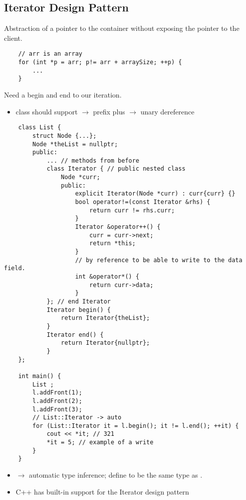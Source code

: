 \subsection{Iterator Design Pattern}
Abstraction of a pointer to the container without exposing the pointer to the client.
\begin{lstlisting}
    // arr is an array
    for (int *p = arr; p!= arr + arraySize; ++p) {
        ...
    }
\end{lstlisting}
Need a begin and end to our iteration.
\begin{itemize}
    \item class should support
    \subitem \code{!=}
    \subitem \code{++} $ \rightarrow $ prefix plus
    \subitem \code{*} $ \rightarrow $ unary dereference
\end{itemize}

\begin{lstlisting}
    class List {
        struct Node {...};
        Node *theList = nullptr;
        public:
            ... // methods from before
            class Iterator { // public nested class
                Node *curr;
                public:
                    explicit Iterator(Node *curr) : curr{curr} {}
                    bool operator!=(const Iterator &rhs) {
                        return curr != rhs.curr;
                    }
                    Iterator &operator++() {
                        curr = curr->next;
                        return *this;
                    }
                    // by reference to be able to write to the data field.
                    int &operator*() {
                        return curr->data;
                    }
            }; // end Iterator
            Iterator begin() {
                return Iterator{theList};
            }
            Iterator end() {
                return Iterator{nullptr};
            }
    };

    int main() {
        List ;
        l.addFront(1);
        l.addFront(2);
        l.addFront(3);
        // List::Iterator -> auto
        for (List::Iterator it = l.begin(); it != l.end(); ++it) {
            cout << *it; // 321
            *it = 5; // example of a write
        }
    }

\end{lstlisting}
\begin{itemize}
    \item {} $ \rightarrow $ automatic type inference; define 
    to be the same type as .
    \item C++ has built-in support for the Iterator design pattern
\end{itemize}
